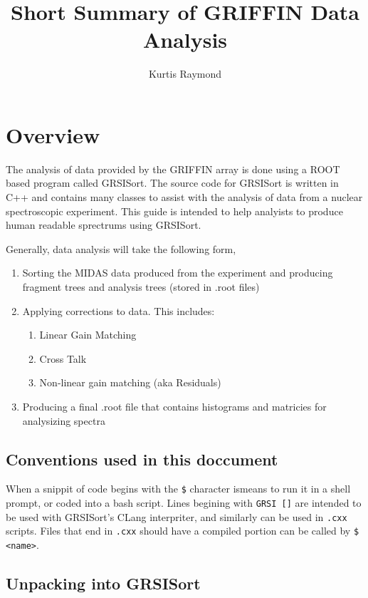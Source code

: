 \documentclass[10pt]{article} %
\title{Short Summary of GRIFFIN Data Analysis}
\author{Kurtis Raymond}
\date{} %
\begin{document}
\maketitle

\section{Overview}

The analysis of data provided by the GRIFFIN array is done using a ROOT based program called GRSISort.
The source code for GRSISort is written in C++ and contains many classes to assist with the analysis of data from a nuclear spectroscopic experiment.
This guide is intended to help analyists to produce human readable sprectrums using GRSISort.

Generally, data analysis will take the following form,
\begin{enumerate}
\item
Sorting the MIDAS data produced from the experiment and producing fragment trees and analysis trees (stored in .root files)
\item
Applying corrections to data.
This includes:
\begin{enumerate}
\item
Linear Gain Matching
\item
Cross Talk
\item
Non-linear gain matching (aka Residuals)
\end{enumerate}
\item
Producing a final .root file that contains histograms and matricies for analysizing spectra
\end{enumerate}

\subsection{Conventions used in this doccument}

When a snippit of code begins with the \texttt{\$} character ismeans to run it in a shell prompt, or coded into a bash script. Lines begining with \texttt{GRSI []} are intended to be used with GRSISort's CLang interpriter, and similarly can be used in \texttt{.cxx} scripts.
Files that end in \texttt{.cxx} should have a compiled portion can be called by \texttt{\$ <name>}.

\subsection{Unpacking into GRSISort}
\end{document}

